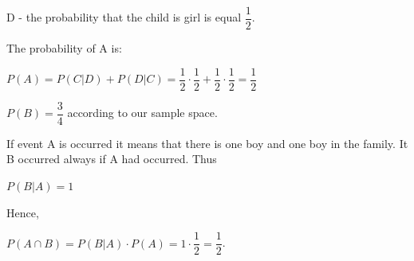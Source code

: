 \documentclass[12pt]{article}
\theoremstyle{definiton}
\theoremstyle{definition}
\theoremstyle{definition}
\begin{document}
		D - the probability that the child is girl is equal $\dfrac{1}{2}$.
		
		The probability of A is:
		
		$P\left(A\right) = P\left(C|D\right) + P\left(D|C\right)= \dfrac{1}{2}\cdot\dfrac{1}{2} + \dfrac{1}{2}\cdot\dfrac{1}{2} = \dfrac{1}{2}$
		
			
		$P\left(B\right) = \dfrac{3}{4}$ according to our sample space.
		
		If event A is occurred it means that there is one boy and one boy in the family. It B occurred always if A had occurred. Thus
		
		$P\left(B|A\right) = 1$
		
		Hence, 
		
		$P(A\cap B) = P\left(B|A\right)\cdot P \left(A\right) = 1 \cdot \dfrac{1}{2}=\dfrac{1}{2}$.
		
\end{document}
